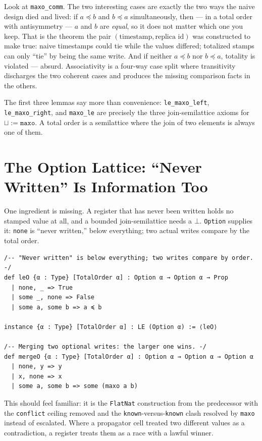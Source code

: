 \documentclass[12pt, a4paper, openright]{book}
\theoremstyle{thmstyle}
\theoremstyle{defstyle}
\newcommand{\lc}[1]{\texttt{#1}}
\newcommand{\lean}[1]{\texttt{#1}}
\begin{document}
Look at \lc{maxo_comm}. The two interesting cases are exactly the two
ways the naive design died and lived: if $a \preccurlyeq b$ and
$b \preccurlyeq a$ simultaneously, then --- in a total order with
antisymmetry --- $a$ and $b$ are \emph{equal}, so it does not matter
which one you keep. That is the theorem the pair
$(\text{timestamp}, \text{replica id})$ was constructed to make true:
naive timestamps could tie while the values differed; totalized stamps
can only ``tie'' by being the same write. And if neither
$a \preccurlyeq b$ nor $b \preccurlyeq a$, totality is violated ---
absurd. Associativity is a four-way case split where transitivity
discharges the two coherent cases and produces the missing comparison
facts in the others.

The first three lemmas say more than convenience: \lc{le_maxo_left},
\lc{le_maxo_right}, and \lc{maxo_le} are precisely the three
join-semilattice axioms for $\sqcup := \lean{maxo}$. A total order is a
semilattice where the join of two elements is always one of them.

\section{The Option Lattice: ``Never Written'' Is Information Too}
\label{sec:option-lattice}

One ingredient is missing. A register that has never been written holds
no stamped value at all, and a bounded join-semilattice needs a $\bot$.
\lc{Option} supplies it: \lc{none} is ``never written,'' below
everything; two actual writes compare by the total order.

\begin{verbatim}
/-- "Never written" is below everything; two writes compare by order. -/
def leO {α : Type} [TotalOrder α] : Option α → Option α → Prop
  | none, _ => True
  | some _, none => False
  | some a, some b => a ≼ b

instance {α : Type} [TotalOrder α] : LE (Option α) := ⟨leO⟩

/-- Merging two optional writes: the larger one wins. -/
def mergeO {α : Type} [TotalOrder α] : Option α → Option α → Option α
  | none, y => y
  | x, none => x
  | some a, some b => some (maxo a b)
\end{verbatim}

This should feel familiar: it is the \lc{FlatNat} construction from the
predecessor with the \lc{conflict} ceiling removed and the
\lc{known}-versus-\lc{known} clash resolved by \lc{maxo} instead of
escalated. Where a propagator cell treated two different values as a
contradiction, a register treats them as a race with a lawful winner.
\end{document}
